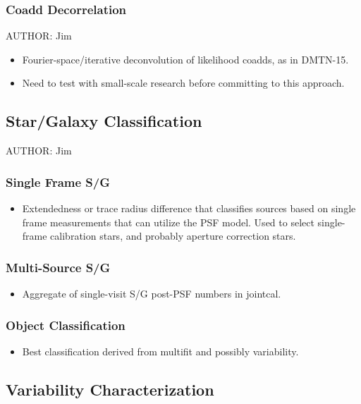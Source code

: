 \subsubsection{Coadd Decorrelation}
\label{sec:acCoaddDecorrelation}
AUTHOR: Jim
\begin{itemize}
\item Fourier-space/iterative deconvolution of likelihood coadds, as in DMTN-15.
\item Need to test with small-scale research before committing to this approach.
\end{itemize}

\subsection{Star/Galaxy Classification}
\label{sec:acClassification}
AUTHOR: Jim
\subsubsection{Single Frame S/G}
\label{sec:acSingleFrameClassification}
\begin{itemize}
\item Extendedness or trace radius difference that classifies sources based on single frame measurements that can utilize the PSF model.  Used to select single-frame calibration stars, and probably aperture correction stars.
\end{itemize}
\subsubsection{Multi-Source S/G}
\label{sec:acJointCalClassification}
\begin{itemize}
\item Aggregate of single-visit S/G post-PSF numbers in jointcal.
\end{itemize}
\subsubsection{Object Classification}
\label{sec:acObjectClassification}
\begin{itemize}
\item Best classification derived from multifit and possibly variability.
\end{itemize}

\subsection{Variability Characterization}
\label{sec:acVariabilityCharacterization}

